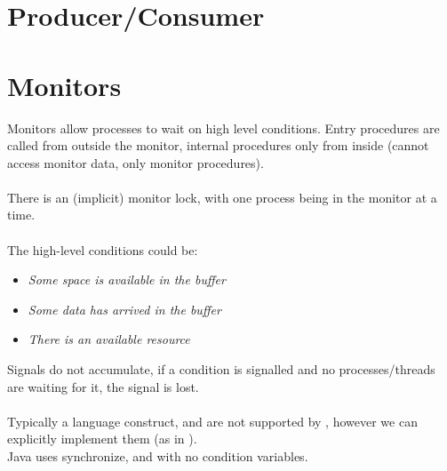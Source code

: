 \documentclass{report}
\begin{document}
\section*{Producer/Consumer}
\begin{itemize}
\end{itemize}
\begin{minipage}[t]{0.45\textwidth}
\end{minipage}
\hfill
\begin{minipage}[t]{0.45\textwidth}
\end{minipage}
\section*{Monitors}
Monitors allow processes to wait on high level conditions. Entry procedures are called from outside the monitor, internal procedures only from inside (cannot access monitor data, only monitor procedures).
\\
\\ There is an (implicit) monitor lock, with one process being in the monitor at a time.
\\
\\ The high-level conditions could be:
\begin{itemize}
	\item \textit{Some space is available in the buffer}
	\item \textit{Some data has arrived in the buffer}
	\item \textit{There is an available resource}
\end{itemize}
Signals do not accumulate, if a condition is signalled and no processes/threads are waiting for it, the signal is lost.
\\
\\ Typically a language construct, and are not supported by , however we can explicitly implement them (as in ).
\\ Java uses synchronize,  and  with no condition variables.
\end{document}
